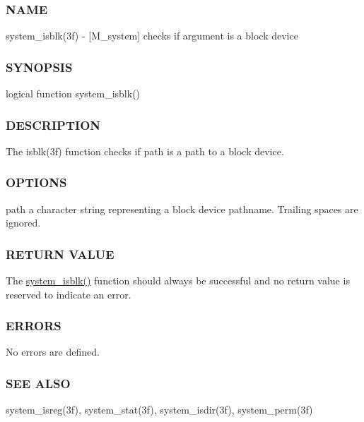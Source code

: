 \subsubsection*{N\+A\+ME}

system\+\_\+isblk(3f) -\/ \mbox{[}M\+\_\+system\mbox{]} checks if argument is a block device 

\subsubsection*{S\+Y\+N\+O\+P\+S\+IS}

\begin{DoxyVerb}logical function system_isblk()
\end{DoxyVerb}


\subsubsection*{D\+E\+S\+C\+R\+I\+P\+T\+I\+ON}

The isblk(3f) function checks if path is a path to a block device.

\subsubsection*{O\+P\+T\+I\+O\+NS}

path a character string representing a block device pathname. Trailing spaces are ignored.

\subsubsection*{R\+E\+T\+U\+RN V\+A\+L\+UE}

The \hyperlink{namespacem__system_a791fa587005ec07cbcd7b0045ee6f43f}{system\+\_\+isblk()} function should always be successful and no return value is reserved to indicate an error.

\subsubsection*{E\+R\+R\+O\+RS}

No errors are defined.

\subsubsection*{S\+EE A\+L\+SO}

system\+\_\+isreg(3f), system\+\_\+stat(3f), system\+\_\+isdir(3f), system\+\_\+perm(3f)

